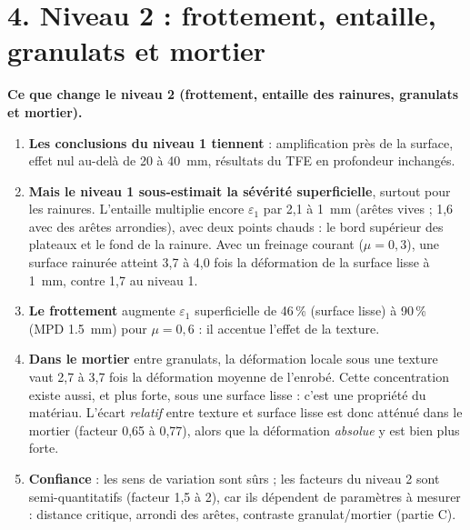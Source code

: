 \documentclass[11pt,a4paper]{article}
\renewcommand{\epsilon}{\varepsilon}
\begin{document}
\section*{4. Niveau 2 : frottement, entaille, granulats et mortier}
\begin{encadre}[colframe=orange!70]
\textbf{Ce que change le niveau 2 (frottement, entaille des rainures, granulats et mortier).}
\begin{enumerate}[nosep]
\item \textbf{Les conclusions du niveau 1 tiennent} : amplification près de la surface, effet nul
      au-delà de 20 à \SI{40}{mm}, résultats du TFE en profondeur inchangés.
\item \textbf{Mais le niveau 1 sous-estimait la sévérité superficielle}, surtout pour les
      rainures. L'entaille multiplie encore $\epsilon_1$ par 2,1 à \SI{1}{mm}
      (arêtes vives ; 1,6 avec des arêtes arrondies), avec deux points chauds :
      le bord supérieur des plateaux et le fond de la rainure. Avec un freinage courant ($\mu=0{,}3$), une surface rainurée
      atteint 3,7 à
      4,0 fois la déformation
      de la surface lisse à \SI{1}{mm}, contre 1,7 au niveau 1.
\item \textbf{Le frottement} augmente $\epsilon_1$ superficielle de 46\,\%
      (surface lisse) à 90\,\% (MPD \SI{1.5}{mm})
      pour $\mu=0{,}6$ : il accentue l'effet de la texture.
\item \textbf{Dans le mortier} entre granulats, la déformation locale sous une texture vaut
      2,7 à 3,7 fois la déformation moyenne de l'enrobé.
      Cette concentration existe aussi, et plus forte, sous une surface lisse : c'est une propriété
      du matériau. L'écart \emph{relatif} entre texture et surface lisse est donc atténué dans le
      mortier (facteur 0,65 à 0,77),
      alors que la déformation \emph{absolue} y est bien plus forte.
\item \textbf{Confiance} : les sens de variation sont sûrs ; les facteurs du niveau 2 sont
      semi-quantitatifs (facteur 1,5 à 2), car ils dépendent de paramètres à mesurer : distance
      critique, arrondi des arêtes, contraste granulat/mortier (partie C).
\end{enumerate}
\end{encadre}
\end{document}
